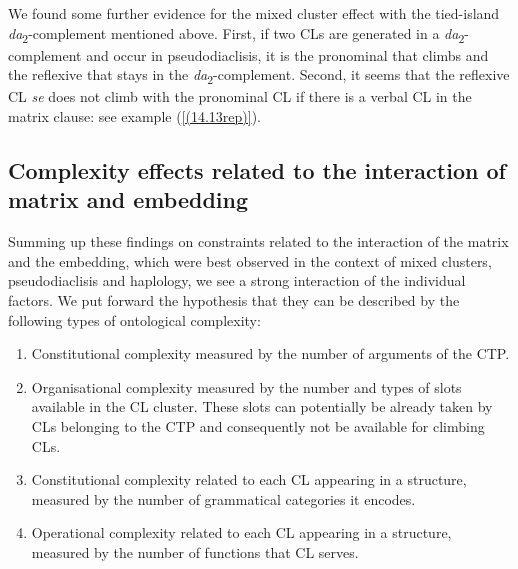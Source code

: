 We found some further evidence for the mixed cluster effect with the tied-island \textit{da}\textsubscript{2}-complement mentioned above. First, if two CLs are generated in a \textit{da}\textsubscript{2}-complement and occur in pseudodiaclisis, it is the pronominal that climbs and the reflexive that stays in the \textit{da}\textsubscript{2}-complement. Second, it seems that the reflexive CL \textit{se} does not climb with the pronominal CL if there is a verbal CL in the matrix clause: see example (\ref{(14.13rep)}). 


\subsection{Complexity effects related to the interaction of matrix and embedding}
\label{Complexity effects related to the interaction of matrix and embedding}
Summing up these findings on constraints related to the interaction of the matrix and the embedding, which were best observed in the context of mixed clusters, pseudodiaclisis and haplology, we see a strong interaction of the individual factors. We put forward the hypothesis that they can be described by the following types of ontological complexity:

\begin{enumerate}
\item Constitutional complexity measured by the number of arguments of the CTP.
\item Organisational complexity measured by the number and types of slots available in the CL cluster. These slots can potentially be already taken by CLs belonging to the CTP and consequently not be available for climbing CLs.
\item Constitutional complexity related to each CL appearing in a structure, measured by the number of grammatical categories it encodes.
\item Operational complexity related to each CL appearing in a structure, measured by the number of functions that CL serves.
\end{enumerate}

